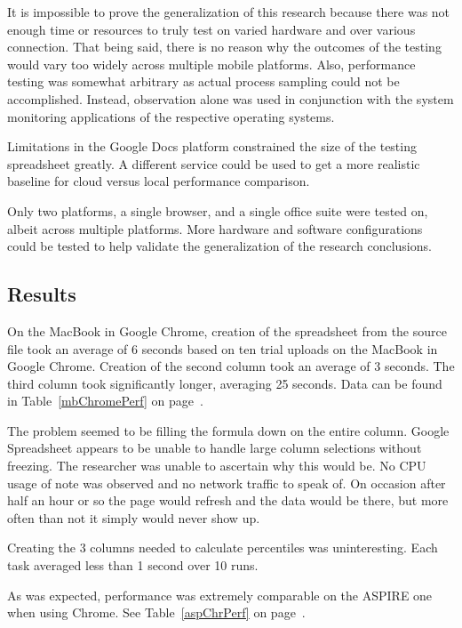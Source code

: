 It is impossible to prove the generalization of this research because there was
not enough time or resources to truly test on varied hardware and over various
connection.  That being said, there is no reason why the outcomes of the testing
would vary too widely across multiple mobile platforms.  Also, performance
testing was somewhat arbitrary as actual process sampling could not be
accomplished.  Instead, observation alone was used in conjunction with the
system monitoring applications of the respective operating systems.

Limitations in the Google Docs platform constrained the size of the testing
spreadsheet greatly.  A different service could be used to get a more realistic
baseline for cloud versus local performance comparison.

Only two platforms, a single browser, and a single office suite were tested on,
albeit across multiple platforms.  More hardware and software configurations
could be tested to help validate the generalization of the research conclusions.

\subsection{Results}

On the MacBook in Google Chrome, creation of the spreadsheet from the source
file took an average of 6 seconds based on ten trial uploads on the MacBook in
Google Chrome. Creation of the second column took an average of 3 seconds. The
third column took significantly longer, averaging 25 seconds. Data can be found
in Table~\ref{mbChromePerf} on page~\pageref{mbChromePerf}.



The problem seemed to be filling the formula down on the entire column.  Google
Spreadsheet appears to be unable to handle large column selections without
freezing.  The researcher was unable to ascertain why this would be.  No CPU
usage of note was observed and no network traffic to speak of.  On occasion
after half an hour or so the page would refresh and the data would be there, but
more often than not it simply would never show up.

Creating the 3 columns needed to calculate percentiles was uninteresting.  Each
task averaged less than 1 second over 10 runs.

As was expected, performance was extremely comparable on the ASPIRE one when
using Chrome. See Table~\ref{aspChrPerf} on page~\pageref{aspChrPerf}.

